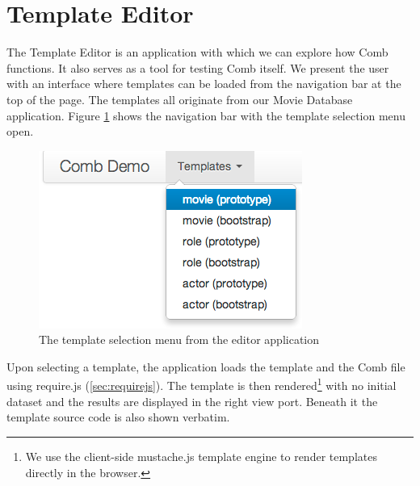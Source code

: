 \documentclass[thesis.tex]{subfiles}
\begin{document}
\section{Template Editor}
The Template Editor is an application with which we can explore how Comb
functions.
It also serves as a tool for testing Comb itself.
We present the user with an interface where templates can be loaded from the
navigation bar at the top of the page. The templates all originate from our
Movie Database application. Figure \ref{fig:template-selection} shows the
navigation bar with the template selection menu open.
\begin{figure}
	\centering
	\includegraphics[max width=\linewidth]{graphics/template-selection}
	\caption{The template selection menu from the editor application}
	\label{fig:template-selection}
\end{figure}
Upon selecting a template, the application loads the template and the Comb file
using require.js (\ref{sec:requirejs}).
The template is then rendered\footnote{We use the client-side mustache.js
template engine to render templates directly in the browser.} with no initial
dataset and the results are displayed in the right view port.
Beneath it the template source code is also shown verbatim.
\end{document}
